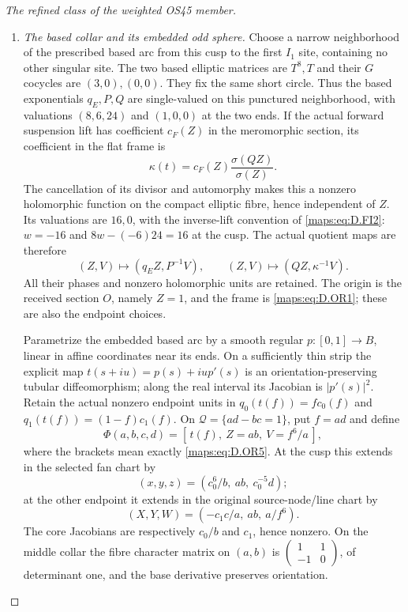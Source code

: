 \begin{proof}[The refined class of the weighted OS45 member]
\begin{enumerate}
The cusp period lattice has columns $(8,-6),(24,-16)$ and is
$8\mathbb Z\oplus2\mathbb Z$.  Translating the selected edge by $(0,-6)$
would use $9(8,-6)-3(24,-16)$, and hence the actual source multiplier
$q_E^9Q^{-3}$ and its actual line multiplier.  No such translation is used.

\item \emph{The based collar and its embedded odd sphere.}
Choose a narrow neighborhood of the prescribed based arc from this cusp
to the first $I_1$ site, containing no other singular site.  The two based
elliptic matrices are $T^8,T$ and their $G$ cocycles are $(3,0),(0,0)$.
They fix the same short circle.  Thus the based exponentials $q_E,P,Q$
are single-valued on this punctured neighborhood, with valuations
$(8,6,24)$ and $(1,0,0)$ at the two ends.  If the actual forward suspension
lift has coefficient $c_F(Z)$ in the meromorphic section, its coefficient
in the flat frame is
\[
 \kappa(t)=c_F(Z)\frac{\sigma(QZ)}{\sigma(Z)}.
 \tag{D.OR4}\label{maps:eq:D.OR4}
\]
The cancellation of its divisor and automorphy makes this a nonzero
holomorphic function on the compact elliptic fibre, hence independent of
$Z$.  Its valuations are $16,0$, with the inverse-lift convention of
\eqref{maps:eq:D.FI2}: $w=-16$ and $8w-(-6)24=16$ at the cusp.
The actual quotient maps are therefore
\[
 (Z,V)\longmapsto(q_E Z,P^{-1}V),\qquad
 (Z,V)\longmapsto(QZ,\kappa^{-1}V).
 \tag{D.OR5}\label{maps:eq:D.OR5}
\]
All their phases and nonzero holomorphic units are retained.  The origin
is the received section $O$, namely $Z=1$, and the frame is
\eqref{maps:eq:D.OR1}; these are also the endpoint choices.

Parametrize the embedded based arc by a smooth regular $p:[0,1]\to B$,
linear in affine coordinates near its ends.  On a sufficiently thin strip
the explicit map $t(s+iu)=p(s)+iu p'(s)$ is an orientation-preserving
tubular diffeomorphism; along the real interval its Jacobian is
$|p'(s)|^2$.  Retain the actual nonzero endpoint units in
$q_0(t(f))=fc_0(f)$ and $q_1(t(f))=(1-f)c_1(f)$.
On $\mathcal Q=\{ad-bc=1\}$, put $f=ad$ and define
\[
 \Phi(a,b,c,d)=[\,t(f),\ Z=ab,\ V=f^6/a\,],
 \tag{D.OR6}\label{maps:eq:D.OR6}
\]
where the brackets mean exactly \eqref{maps:eq:D.OR5}.  At the cusp this
extends in the selected fan chart by
\[
 (x,y,z)=(c_0^6/b,\ ab,\ c_0^{-5}d);
\]
at the other endpoint it extends in the original source-node/line chart by
\[
 (X,Y,W)=(-c_1c/a,\ ab,\ a/f^6).
 \tag{D.OR7}\label{maps:eq:D.OR7}
\]
The core Jacobians are respectively $c_0/b$ and $c_1$, hence nonzero.
On the middle collar the fibre character matrix on $(a,b)$ is
$\left(\begin{smallmatrix}1&1\\-1&0\end{smallmatrix}\right)$, of determinant
one, and the base derivative preserves orientation.


\end{enumerate}
\end{proof}
